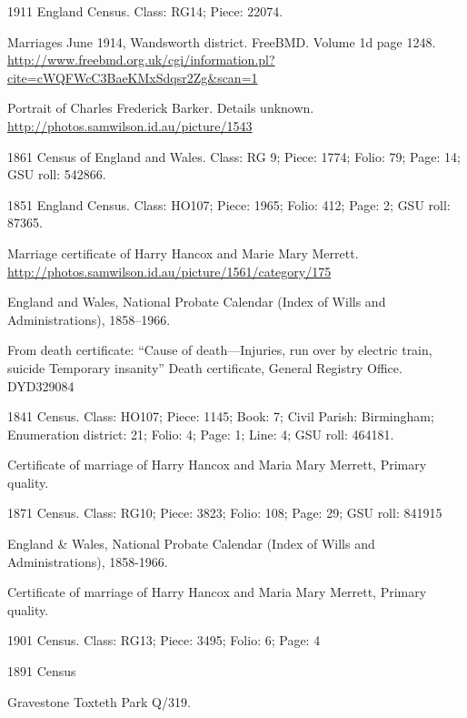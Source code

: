 \begin{thebibliography}{99}
	1911 England Census. Class: RG14; Piece: 22074.

	Marriages June 1914, Wandsworth district. FreeBMD. Volume 1d page 1248.
	\url{http://www.freebmd.org.uk/cgi/information.pl?cite=cWQFWcC3BaeKMxSdqsr2Zg&scan=1}

	Portrait of Charles Frederick Barker. Details unknown.
	\url{http://photos.samwilson.id.au/picture/1543}

	1861 Census of England and Wales.
	Class: RG 9; Piece: 1774; Folio: 79; Page: 14; GSU roll: 542866.

	1851 England Census.
	Class: HO107; Piece: 1965; Folio: 412; Page: 2; GSU roll: 87365.

	Marriage certificate of Harry Hancox and Marie Mary Merrett.
	\url{http://photos.samwilson.id.au/picture/1561/category/175}

	England and Wales, National Probate Calendar (Index of Wills and Administrations), 1858--1966.

	From death certificate: ``Cause of death---Injuries, run over by electric train, suicide Temporary insanity''
	Death certificate, General Registry Office. DYD329084
	
	1841 Census. 
	Class: HO107; Piece: 1145; Book: 7; Civil Parish: Birmingham; Enumeration district: 21; Folio: 4; Page: 1; Line: 4; GSU roll: 464181.

	Certificate of marriage of Harry Hancox and Maria Mary Merrett, Primary quality. 
	
	1871 Census.
	Class: RG10; Piece: 3823; Folio: 108; Page: 29; GSU roll: 841915
	
	England & Wales, National Probate Calendar (Index of Wills and Administrations), 1858-1966.
	
	Certificate of marriage of Harry Hancox and Maria Mary Merrett, Primary quality.
	
	1901 Census.
	Class: RG13; Piece: 3495; Folio: 6; Page: 4
	
	1891 Census
	
	Gravestone Toxteth Park Q/319. 
	

\end{thebibliography}
